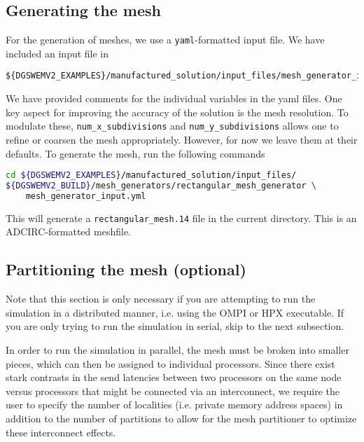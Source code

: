 \subsection{Generating the mesh}
For the generation of meshes, we use a \lstinline{yaml}-formatted input file. We have included an input file in
\begin{lstlisting}
${DGSWEMV2_EXAMPLES}/manufactured_solution/input_files/mesh_generator_input.yml
\end{lstlisting}
We have provided comments for the individual variables in the yaml files. One key aspect for improving the accuracy of the solution is the mesh resolution. To modulate these, \lstinline{num_x_subdivisions} and \lstinline{num_y_subdivisions} allows one to refine or coarsen the mesh appropriately. However, for now we leave them at their defaults. To generate the mesh, run the following commands
\begin{lstlisting}[language=bash]
cd ${DGSWEMV2_EXAMPLES}/manufactured_solution/input_files/
${DGSWEMV2_BUILD}/mesh_generators/rectangular_mesh_generator \
    mesh_generator_input.yml
\end{lstlisting}
This will generate a \lstinline{rectangular_mesh.14} file in the current directory. This is an ADCIRC-formatted meshfile.

\subsection{Partitioning the mesh (optional)}
Note that this section is only necessary if you are attempting to run the simulation in a distributed manner, i.e. using the OMPI or HPX executable. If you are only trying to run the simulation in serial, skip to the next subsection.

In order to run the simulation in parallel, the mesh must be broken into smaller pieces, which can then be assigned to individual processors. Since there exist stark contrasts in the send latencies between two processors on the same node versus processors that might be connected via an interconnect, we require the user to specify the number of localities (i.e. private memory address spaces) in addition to the number of partitions to allow for the mesh partitioner to optimize these interconnect effects.

